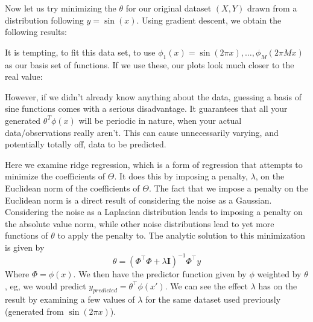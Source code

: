 \documentclass[11pt,letterpaper]{article}
\begin{document}
Now let us try minimizing the $\theta$ for our original dataset $(X, Y)$ drawn from a distribution following $y = \sin(x)$. Using gradient descent, we obtain the following results:

It is tempting, to fit this data set, to use $\phi_1(x) = \sin(2\pi x), \ldots , \phi_M(2\pi Mx)$ as our basis set of functions. If we use these, our plots look much closer to the real value:

However, if we didn't already know anything about the data, guessing a basis of sine functions comes with a serious disadvantage. It guarantees that all your generated $\theta^T\phi(x)$ will be periodic in nature, when your actual data/observations really aren't. This can cause unnecessarily varying, and potentially totally off, data to be predicted.


Here we examine ridge regression, which is a form of regression that attempts to minimize the coefficients of $\Theta$. It does this by imposing a penalty, $\lambda$, on the Euclidean norm of the coefficients of $\Theta$. The fact that we impose a penalty on the Euclidean norm is a direct result of considering the noise as a Gaussian. Considering the noise as a Laplacian distribution leads to imposing a penalty on the absolute value norm, while other noise distributions lead to yet more functions of $\theta$ to apply the penalty to. The analytic solution to this minimization is given by
\[ \theta = (\Phi^\intercal \Phi + \lambda \mathbf{I})^{-1}\Phi^\intercal y \]
Where $\Phi = \phi(x)$. We then have the predictor function given by $\phi$ weighted by $\theta$, eg, we would predict $y_{predicted} = \theta^\intercal \phi(x')$. We can see the effect $\lambda$ has on the result by examining a few values of $\lambda$ for the same dataset used previously (generated from $\sin(2\pi x)$).
\end{document}
